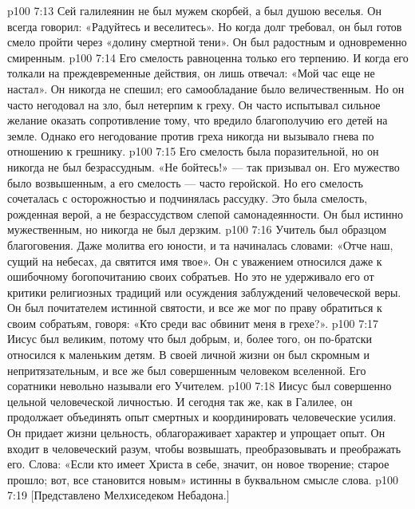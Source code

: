 \vs p100 7:13 Сей галилеянин не был мужем скорбей, а был душою веселья. Он всегда говорил: «Радуйтесь и веселитесь». Но когда долг требовал, он был готов смело пройти через «долину смертной тени». Он был радостным и одновременно смиренным.
\vs p100 7:14 Его смелость равноценна только его терпению. И когда его толкали на преждевременные действия, он лишь отвечал: «Мой час еще не настал». Он никогда не спешил; его самообладание было величественным. Но он часто негодовал на зло, был нетерпим к греху. Он часто испытывал сильное желание оказать сопротивление тому, что вредило благополучию его детей на земле. Однако его негодование против греха никогда ни вызывало гнева по отношению к грешнику.
\vs p100 7:15 Его смелость была поразительной, но он никогда не был безрассудным. «Не бойтесь!» --- так призывал он. Его мужество было возвышенным, а его смелость --- часто геройской. Но его смелость сочеталась с осторожностью и подчинялась рассудку. Это была смелость, рожденная верой, а не безрассудством слепой самонадеянности. Он был истинно мужественным, но никогда не был дерзким.
\vs p100 7:16 Учитель был образцом благоговения. Даже молитва его юности, и та начиналась словами: «Отче наш, сущий на небесах, да святится имя твое». Он с уважением относился даже к ошибочному богопочитанию своих собратьев. Но это не удерживало его от критики религиозных традиций или осуждения заблуждений человеческой веры. Он был почитателем истинной святости, и все же мог по праву обратиться к своим собратьям, говоря: «Кто среди вас обвинит меня в грехе?».
\vs p100 7:17 Иисус был великим, потому что был добрым, и, более того, он по\hyp{}братски относился к маленьким детям. В своей личной жизни он был скромным и непритязательным, и все же был совершенным человеком вселенной. Его соратники невольно называли его Учителем.
\vs p100 7:18 Иисус был совершенно цельной человеческой личностью. И сегодня так же, как в Галилее, он продолжает объединять опыт смертных и координировать человеческие усилия. Он придает жизни цельность, облагораживает характер и упрощает опыт. Он входит в человеческий разум, чтобы возвышать, преобразовывать и преображать его. Слова: «Если кто имеет Христа в себе, значит, он новое творение; старое прошло; вот, все становится новым» истинны в буквальном смысле слова.
\vs p100 7:19 [Представлено Мелхиседеком Небадона.]
